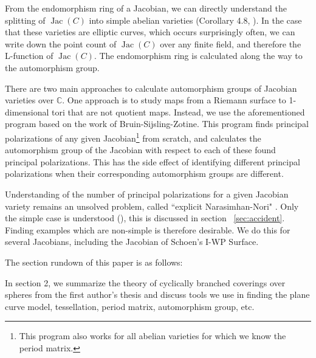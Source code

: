 \documentclass[12pt,reqno]{amsart}
\DeclareMathOperator{\Jac}{Jac}
\newcommand{\C}{\mathbb{C}}
\newcommand{\n}{\newline}
\theoremstyle{definition}
\theoremstyle{remark}
\newcommand{\ti}{\todo[inline]}
\begin{document}
From the endomorphism ring of a Jacobian, we can directly understand the splitting of $\Jac(C)$ into simple abelian varieties (Corollary 4.8, \cite{jeroen}). In the case that these varieties are elliptic curves, which occurs surprisingly often, we can write down the point count of $\Jac(C)$ over any finite field, and therefore the L-function of $\Jac(C)$. The endomorphism ring is calculated along the way to the automorphism group.


There are two main approaches to calculate automorphism groups of Jacobian varieties over $\C$. One approach is to study maps from a Riemann surface to 1-dimensional tori that are not quotient maps. Instead, we use the aforementioned program based on the work of Bruin-Sijsling-Zotine. This program finds principal polarizations of any given Jacobian\footnote{This program also works for all abelian varieties for which we know the period matrix.} from scratch, and calculates the automorphism group of the Jacobian with respect to each of these found principal polarizations. This has the side effect of identifying different principal polarizations when their corresponding automorphism groups are different. 
    
Understanding of the number of principal polarizations for a given Jacobian variety remains an unsolved problem, called ``explicit Narasimhan-Nori" \cite{nn}. Only the simple case is understood (\cite{several}), this is discussed in section ~\ref{sec:accident}. Finding examples which are non-simple is therefore desirable. We do this for several Jacobians, including the Jacobian of Schoen's I-WP Surface. 



$\text{}$\n The section rundown of this paper is as follows:

In section 2, we summarize the theory of cyclically branched coverings over spheres from the first author's thesis \cite{dthesis} and discuss tools we use in finding the plane curve model, tessellation, period matrix, automorphism group, etc.
\end{document}
